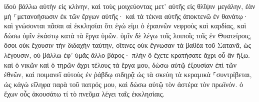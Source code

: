 \documentclass{openreader}
\begin{document}
ἰδοὺ βάλλω αὐτὴν εἰς κλίνην, καὶ τοὺς μοιχεύοντας μετ’ αὐτῆς εἰς θλῖψιν μεγάλην, ἐὰν μὴ ⸀μετανοήσωσιν ἐκ τῶν ἔργων αὐτῆς· 
καὶ τὰ τέκνα αὐτῆς ἀποκτενῶ ἐν θανάτῳ· καὶ γνώσονται πᾶσαι αἱ ἐκκλησίαι ὅτι ἐγώ εἰμι ὁ ἐραυνῶν νεφροὺς καὶ καρδίας, καὶ δώσω ὑμῖν ἑκάστῳ κατὰ τὰ ἔργα ὑμῶν. 
ὑμῖν δὲ λέγω τοῖς λοιποῖς τοῖς ἐν Θυατείροις, ὅσοι οὐκ ἔχουσιν τὴν διδαχὴν ταύτην, οἵτινες οὐκ ἔγνωσαν τὰ βαθέα τοῦ Σατανᾶ, ὡς λέγουσιν, οὐ βάλλω ἐφ’ ὑμᾶς ἄλλο βάρος· 
πλὴν ὃ ἔχετε κρατήσατε ἄχρι οὗ ἂν ἥξω. 
καὶ ὁ νικῶν καὶ ὁ τηρῶν ἄχρι τέλους τὰ ἔργα μου, δώσω αὐτῷ ἐξουσίαν ἐπὶ τῶν ἐθνῶν, 
καὶ ποιμανεῖ αὐτοὺς ἐν ῥάβδῳ σιδηρᾷ ὡς τὰ σκεύη τὰ κεραμικὰ ⸀συντρίβεται, 
ὡς κἀγὼ εἴληφα παρὰ τοῦ πατρός μου, καὶ δώσω αὐτῷ τὸν ἀστέρα τὸν πρωϊνόν. 
ὁ ἔχων οὖς ἀκουσάτω τί τὸ πνεῦμα λέγει ταῖς ἐκκλησίαις. 
\end{document}
